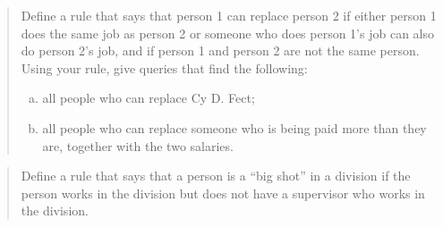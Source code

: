 \begin{quote}
 Define a rule that says that
person 1 can replace person 2 if either person 1 does the same job as person 2
or someone who does person 1's job can also do person 2's job, and if person 1
and person 2 are not the same person. Using your rule, give queries that find
the following:

\begin{enumerate}[a.]

\item
all people who can replace Cy D. Fect;

\item
all people who can replace someone who is being paid more than they are,
together with the two salaries.

\end{enumerate}
\end{quote}

\begin{quote}
 Define a rule that says that a
person is a ``big shot'' in a division if the person works in the division but
does not have a supervisor who works in the division.
\end{quote}

